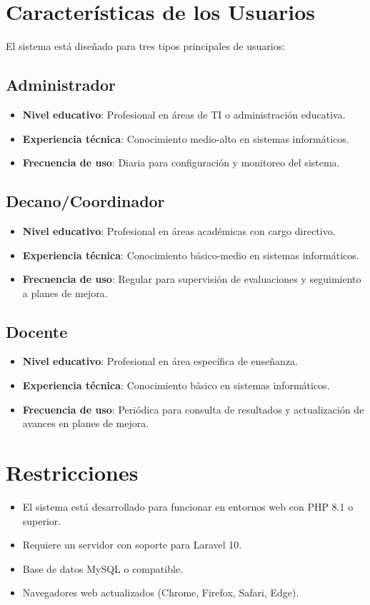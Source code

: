 \documentclass[12pt,a4paper]{book}
\begin{document}
\section{Características de los Usuarios}
El sistema está diseñado para tres tipos principales de usuarios:

\subsection{Administrador}
\begin{itemize}
    \item \textbf{Nivel educativo}: Profesional en áreas de TI o administración educativa.
    \item \textbf{Experiencia técnica}: Conocimiento medio-alto en sistemas informáticos.
    \item \textbf{Frecuencia de uso}: Diaria para configuración y monitoreo del sistema.
\end{itemize}

\subsection{Decano/Coordinador}
\begin{itemize}
    \item \textbf{Nivel educativo}: Profesional en áreas académicas con cargo directivo.
    \item \textbf{Experiencia técnica}: Conocimiento básico-medio en sistemas informáticos.
    \item \textbf{Frecuencia de uso}: Regular para supervisión de evaluaciones y seguimiento a planes de mejora.
\end{itemize}

\subsection{Docente}
\begin{itemize}
    \item \textbf{Nivel educativo}: Profesional en área específica de enseñanza.
    \item \textbf{Experiencia técnica}: Conocimiento básico en sistemas informáticos.
    \item \textbf{Frecuencia de uso}: Periódica para consulta de resultados y actualización de avances en planes de mejora.
\end{itemize}

\section{Restricciones}
\begin{itemize}
    \item El sistema está desarrollado para funcionar en entornos web con PHP 8.1 o superior.
    \item Requiere un servidor con soporte para Laravel 10.
    \item Base de datos MySQL o compatible.
    \item Navegadores web actualizados (Chrome, Firefox, Safari, Edge).
\end{itemize}
\end{document}
